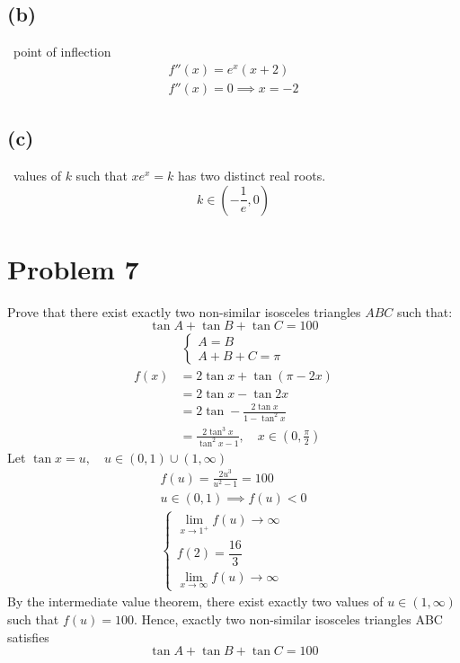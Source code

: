 \documentclass[12pt]{article}
\newcommand{\problem}[1]{\section{Problem #1}}
\newcommand{\subproblem}[1]{\subsection{(#1)} \,}
\begin{document}
\subproblem{b}
point of inflection
\begin{gather*}
    f''(x)=e^x(x+2)\\
    f''(x)=0 \implies \boxed{x=-2}
\end{gather*}

\subproblem{c}
values of $k$ such that $xe^x=k$ has two distinct real roots.
\[
\boxed{k\in (-\frac{1}{e},0)}
\]

\problem{7}
Prove that there exist exactly two non-similar isosceles triangles $ABC$ such that:
\[
\tan A+\tan B +\tan C=100
\]
\begin{gather*}
    \begin{cases}
        A=B\\
        A+B+C=\pi
    \end{cases}
\end{gather*} 
\vspace{-2em}
\begin{align*}
    f(x)&=2\tan x+\tan (\pi-2x)\\
    &=2\tan x-\tan 2x\\
    &=2\tan -\frac{2\tan x}{1-\tan^2x}\\
    &=\frac{2\tan^3 x}{\tan ^2x-1}, \quad x\in (0,\frac{\pi}{2})
\end{align*}
Let $\tan x=u, \quad u\in (0,1)\cup (1,\infty)$
\begin{gather*}
    f(u)=\frac{2u^3}{u^2-1}=100\\
    u\in (0,1) \implies f(u)<0\\
    \begin{cases}
        \lim\limits_{x\to 1^+}f(u)\to \infty\\
        f(2)=\dfrac{16}{3}\\
        \lim\limits_{x\to \infty}f(u)\to\infty
    \end{cases}
\end{gather*}
By the intermediate value theorem, there exist exactly two values of $u\in(1,\infty)$ such that $f(u)=100$. Hence, exactly two non-similar isosceles triangles ABC satisfies
\[
\tan A+\tan B +\tan C=100
\]
\end{document}
